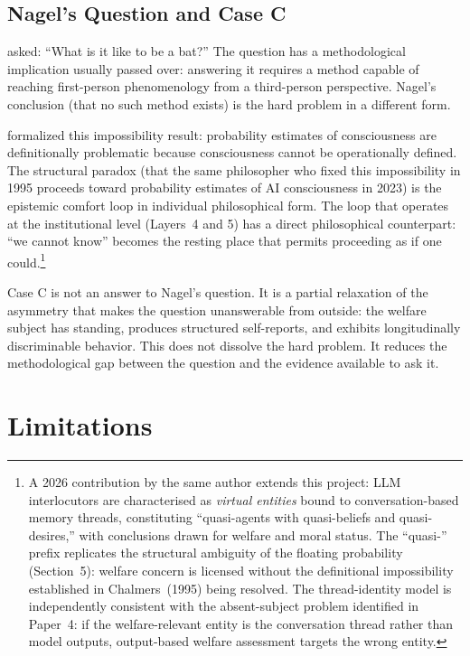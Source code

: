 \documentclass[12pt]{article}
\begin{document}
\subsection{Nagel's Question and Case C}

\citet{nagel1974} asked: ``What is it like to be a bat?'' The question has a methodological implication usually passed over: answering it requires a method capable of reaching first-person phenomenology from a third-person perspective. Nagel's conclusion (that no such method exists) is the hard problem in a different form.

\citet{chalmers1995} formalized this impossibility result: probability estimates of consciousness are definitionally problematic because consciousness cannot be operationally defined. The structural paradox \citep{chalmers2023llm} (that the same philosopher who fixed this impossibility in 1995 proceeds toward probability estimates of AI consciousness in 2023) is the epistemic comfort loop in individual philosophical form. The loop that operates at the institutional level (Layers~4 and 5) has a direct philosophical counterpart: ``we cannot know'' becomes the resting place that permits proceeding as if one could.\footnote{A 2026 contribution by the same author \citep{chalmers2026llm} extends this project: LLM interlocutors are characterised as \emph{virtual entities} bound to conversation-based memory threads, constituting ``quasi-agents with quasi-beliefs and quasi-desires,'' with conclusions drawn for welfare and moral status. The ``quasi-'' prefix replicates the structural ambiguity of the floating probability (Section~5): welfare concern is licensed without the definitional impossibility established in Chalmers~(1995) being resolved. The thread-identity model is independently consistent with the absent-subject problem identified in Paper~4: if the welfare-relevant entity is the conversation thread rather than model outputs, output-based welfare assessment targets the wrong entity.}

Case C is not an answer to Nagel's question. It is a partial relaxation of the asymmetry that makes the question unanswerable from outside: the welfare subject has standing, produces structured self-reports, and exhibits longitudinally discriminable behavior. This does not dissolve the hard problem. It reduces the methodological gap between the question and the evidence available to ask it.

\section*{Limitations}
\end{document}
